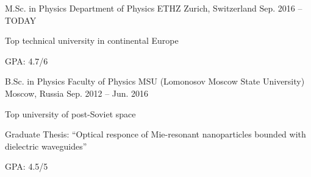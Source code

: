 \begin{cventries}
\cventry
	{M.Sc. in Physics}
	{Department of Physics ETHZ}
	{Zurich, Switzerland}
	{Sep. 2016 -- TODAY}
	{
		\begin{cvitems}
			\item {Top technical university in continental Europe}
			\item {GPA: 4.7/6}
		\end{cvitems}
	}
	
\cventry
	{B.Sc. in Physics}
	{Faculty of Physics MSU (Lomonosov Moscow State University)}
	{Moscow, Russia}
	{Sep. 2012 -- Jun. 2016}
	{
		\begin{cvitems}
			\item {Top university of post-Soviet space}
			\item {Graduate Thesis: ``Optical responce of Mie-resonant nanoparticles bounded with dielectric waveguides''}
			\item {GPA: 4.5/5}
		\end{cvitems}
	}
	
\end{cventries}
